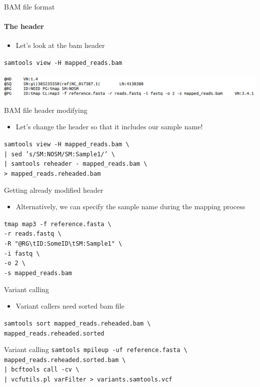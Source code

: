 \documentclass{beamer}
\makeatletter
\newcommand{\tmapWithRG}[3]{\texttt{tmap map3 -f #1 \textbackslash \\
    -r #2 \textbackslash \\
    -R "@RG\textbackslash tID:SomeID\textbackslash tSM:Sample1" \textbackslash \\
    -i fastq \textbackslash \\
    -o 2 \textbackslash \\
    -s #3
  }
}
\newcommand{\sortbam}[2]{\texttt{samtools sort #1 \textbackslash \\ #2}}
\newcommand{\reheader}[2]{\texttt{samtools view -H #1 \textbackslash \\
    | sed 's/SM:NOSM/SM:Sample1/' \textbackslash \\
    | samtools reheader - mapped\_reads.bam \textbackslash \\
    > #2
  }
}
\newcommand{\samtoolssnp}[3]{\texttt{samtools mpileup -uf #1 \textbackslash \\
    #2 \textbackslash \\
    | bcftools call -cv \textbackslash \\
    | vcfutils.pl varFilter > #3
  }
}
\makeatother
\begin{document}
\begin{frame}{BAM file format}
  \framesubtitle{The header}
    \begin{itemize}
      \item Let's look at the bam header
    \end{itemize}
  \texttt{samtools view -H mapped\_reads.bam} \\~\\
  \includegraphics[width=\linewidth, keepaspectratio]{pic/bam_head.png}
\end{frame}

\begin{frame}{BAM file header modifying}
  \begin{itemize}
    \item Let's change the header so that it includes our sample name!
  \end{itemize}
  \reheader{mapped\_reads.bam}{mapped\_reads.reheaded.bam}
\end{frame}

\begin{frame}{Getting already modified header}
  \begin{itemize}
    \item Alternatively, we can specify the sample name during the mapping process
  \end{itemize}
  \tmapWithRG{reference.fasta}{reads.fastq}{mapped\_reads.bam}
\end{frame}

\begin{frame} {Variant calling}
  \begin{itemize}
    \item Variant callers need sorted bam file
  \end{itemize}
  \sortbam{mapped\_reads.reheaded.bam}{mapped\_reads.reheaded.sorted}
\end{frame}

\begin{frame}{Variant calling}
  \samtoolssnp{reference.fasta}{mapped\_reads.reheaded.sorted.bam}{variants.samtools.vcf}
\end{frame}
\end{document}
